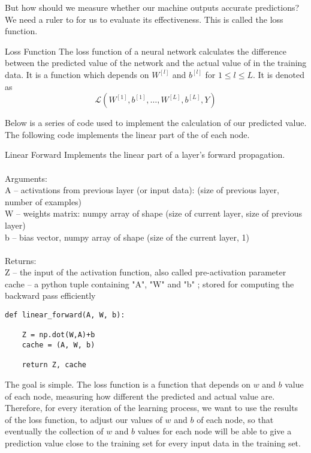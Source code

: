 \documentclass[a4paper]{article}
\begin{document}
But how should we measure whether our machine outputs accurate predictions? We need a ruler to for us to evaluate its effectiveness. This is called the loss function. 

\begin{defn}{Loss Function}{} The loss function of a neural network calculates the difference between the predicted value of the network and the actual value of in the training data. It is a function which depends on $W^{[l]}$ and $b^{[l]}$ for $1\leq l\leq L$. It is denoted as $$\mathcal{L}(W^{[1]},b^{[1]},\dots,W^{[L]},b^{[L]},Y)$$
\end{defn}

Below is a series of code used to implement the calculation of our predicted value. 
The following code implements the linear part of the of each node. 

\begin{alg}{Linear Forward}{} Implements the linear part of a layer's forward propagation.\\~\\
Arguments:\\
A -- activations from previous layer (or input data): (size of previous layer, number of examples)\\
W -- weights matrix: numpy array of shape (size of current layer, size of previous layer)\\
b -- bias vector, numpy array of shape (size of the current layer, 1)\\~\\
Returns:\\
Z -- the input of the activation function, also called pre-activation parameter\\
cache -- a python tuple containing "A", "W" and "b" ; stored for computing the backward pass efficiently\\
\begin{verbatim}
def linear_forward(A, W, b):

    Z = np.dot(W,A)+b
    cache = (A, W, b)
    
    return Z, cache
\end{verbatim}
\end{alg}

The goal is simple. The loss function is a function that depends on $w$ and $b$ value of each node, measuring how different the predicted and actual value are. Therefore, for every iteration of the learning process, we want to use the results of the loss function, to adjust our values of $w$ and $b$ of each node, so that eventually the collection of $w$ and $b$ values for each node will be able to give a prediction value close to the training set for every input data in the training set. 
\end{document}

